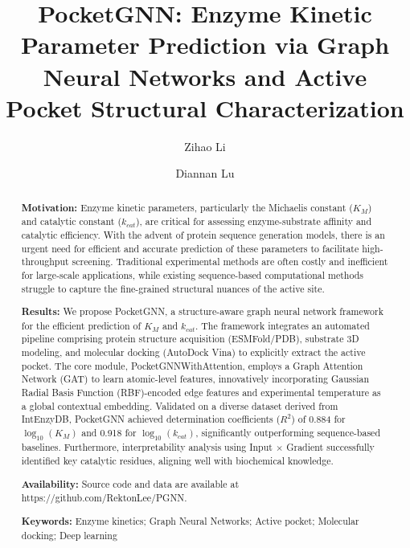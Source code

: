 \documentclass[11pt, a4paper]{article}
\title{\textbf{PocketGNN: Enzyme Kinetic Parameter Prediction via Graph Neural Networks and Active Pocket Structural Characterization}}
\author[1]{Zihao Li}
\author[1,*]{Diannan Lu}
\affil[1]{Department of Chemical Engineering, Tsinghua University, Beijing, China}
\affil[*]{Corresponding author: ludiannan@tsinghua.edu.cn}
\date{}
\begin{document}
\maketitle


\begin{abstract}
\noindent
\textbf{Motivation:} Enzyme kinetic parameters, particularly the Michaelis constant ($K_{M}$) and catalytic constant ($k_{cat}$), are critical for assessing enzyme-substrate affinity and catalytic efficiency. With the advent of protein sequence generation models, there is an urgent need for efficient and accurate prediction of these parameters to facilitate high-throughput screening. Traditional experimental methods are often costly and inefficient for large-scale applications, while existing sequence-based computational methods struggle to capture the fine-grained structural nuances of the active site.

\noindent
\textbf{Results:} We propose PocketGNN, a structure-aware graph neural network framework for the efficient prediction of $K_{M}$ and $k_{cat}$. The framework integrates an automated pipeline comprising protein structure acquisition (ESMFold/PDB), substrate 3D modeling, and molecular docking (AutoDock Vina) to explicitly extract the active pocket. The core module, PocketGNNWithAttention, employs a Graph Attention Network (GAT) to learn atomic-level features, innovatively incorporating Gaussian Radial Basis Function (RBF)-encoded edge features and experimental temperature as a global contextual embedding. Validated on a diverse dataset derived from IntEnzyDB, PocketGNN achieved determination coefficients ($R^{2}$) of 0.884 for $\log_{10}(K_{M})$ and 0.918 for $\log_{10}(k_{cat})$, significantly outperforming sequence-based baselines. Furthermore, interpretability analysis using Input $\times$ Gradient successfully identified key catalytic residues, aligning well with biochemical knowledge.

\noindent
\textbf{Availability:} Source code and data are available at https://github.com/RektonLee/PGNN.

\noindent
\textbf{Keywords:} Enzyme kinetics; Graph Neural Networks; Active pocket; Molecular docking; Deep learning
\end{abstract}

\end{document}
